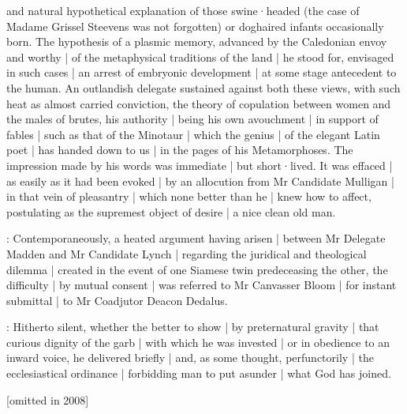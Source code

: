 and natural hypothetical explanation of those swine·headed
(the case of Madame Grissel Steevens was not forgotten)
or doghaired infants occasionally born.
The hypothesis of a plasmic memory,
advanced by the Caledonian envoy and worthy |
of the metaphysical traditions of the land |
he stood for,
envisaged in such cases |
an arrest of embryonic development |
at some stage antecedent to the human.
An outlandish delegate sustained against both these views,
with such heat as almost carried conviction,
the theory of copulation between women and the males of brutes,
his authority |
being his own avouchment |
in support of fables |
such as that of the Minotaur |
which the genius |
of the elegant Latin poet |
has handed down to us |
in the pages of his Metamorphoses.
The impression made by his words was immediate |
but short·lived.
It was effaced |
as easily as it had been evoked |
by an allocution from Mr Candidate Mulligan |
in that vein of pleasantry |
which none better than he |
knew how to affect,
postulating as the supremest object of desire |
a nice clean old man.

:
Contemporaneously,
a heated argument having arisen |
between Mr Delegate Madden and Mr Candidate Lynch |
regarding the juridical and theological dilemma |
created in the event of one Siamese twin predeceasing the other,
the difficulty |
by mutual consent |
was referred to Mr Canvasser Bloom |
for instant submittal |
to Mr Coadjutor Deacon Dedalus.

:
Hitherto silent,
whether the better to show |
by preternatural gravity |
that curious dignity of the garb |
with which he was invested |
or in obedience to an inward voice,
he delivered briefly |
and,
as some thought,
perfunctorily |
the ecclesiastical ordinance |
forbidding man to put asunder |
what God has joined.



[omitted in 2008]

